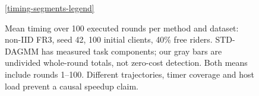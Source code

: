 \documentclass[11pt,a4paper]{article}
\newcommand{\TimingDataDir}{../../result_check/paper_version_staging/versions/v06_v15_4_full_study/generated/timing}
\begin{document}
\begin{figure}[!ht]
\par\ref{timing-segments-legend}
\caption{Mean timing over 100 executed rounds per method and dataset: non-IID FR3, seed 42, 100 initial clients, 40\% free riders. STD-DAGMM has measured task components; our gray bars are undivided whole-round totals, not zero-cost detection. Both means include rounds 1--100. Different trajectories, timer coverage and host load prevent a causal speedup claim.}\label{fig:timing-segments}
\end{figure}
\end{document}
